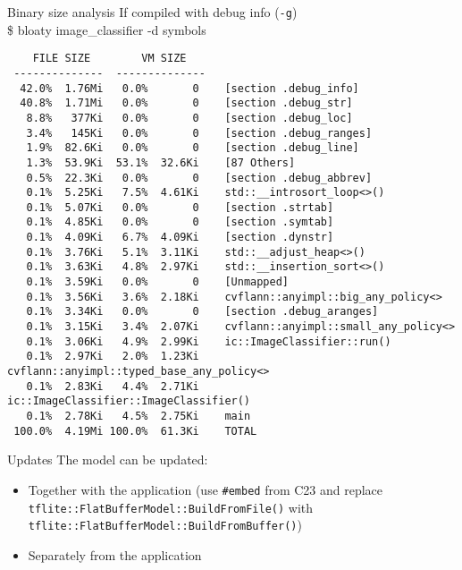 \begin{frame}[fragile]{Binary size analysis}
If compiled with debug info (\texttt{-g}) \\
\ttfamily \$ bloaty image\_classifier -d symbols
  \lstset{basicstyle=\tiny, numbers=left}
  \begin{lstlisting}
    FILE SIZE        VM SIZE    
 --------------  -------------- 
  42.0%  1.76Mi   0.0%       0    [section .debug_info]
  40.8%  1.71Mi   0.0%       0    [section .debug_str]
   8.8%   377Ki   0.0%       0    [section .debug_loc]
   3.4%   145Ki   0.0%       0    [section .debug_ranges]
   1.9%  82.6Ki   0.0%       0    [section .debug_line]
   1.3%  53.9Ki  53.1%  32.6Ki    [87 Others]
   0.5%  22.3Ki   0.0%       0    [section .debug_abbrev]
   0.1%  5.25Ki   7.5%  4.61Ki    std::__introsort_loop<>()
   0.1%  5.07Ki   0.0%       0    [section .strtab]
   0.1%  4.85Ki   0.0%       0    [section .symtab]
   0.1%  4.09Ki   6.7%  4.09Ki    [section .dynstr]
   0.1%  3.76Ki   5.1%  3.11Ki    std::__adjust_heap<>()
   0.1%  3.63Ki   4.8%  2.97Ki    std::__insertion_sort<>()
   0.1%  3.59Ki   0.0%       0    [Unmapped]
   0.1%  3.56Ki   3.6%  2.18Ki    cvflann::anyimpl::big_any_policy<>
   0.1%  3.34Ki   0.0%       0    [section .debug_aranges]
   0.1%  3.15Ki   3.4%  2.07Ki    cvflann::anyimpl::small_any_policy<>
   0.1%  3.06Ki   4.9%  2.99Ki    ic::ImageClassifier::run()
   0.1%  2.97Ki   2.0%  1.23Ki    cvflann::anyimpl::typed_base_any_policy<>
   0.1%  2.83Ki   4.4%  2.71Ki    ic::ImageClassifier::ImageClassifier()
   0.1%  2.78Ki   4.5%  2.75Ki    main
 100.0%  4.19Mi 100.0%  61.3Ki    TOTAL
  \end{lstlisting}
\end{frame}

\begin{frame}{Updates}
The model can be updated:
  \begin{itemize}
	\item Together with the application (use \texttt{\#embed} from C23 and
	replace \texttt{tflite::FlatBufferModel::BuildFromFile()} with
	\texttt{tflite::FlatBufferModel::BuildFromBuffer()})
	\item Separately from the application
  \end{itemize}
\end{frame}

